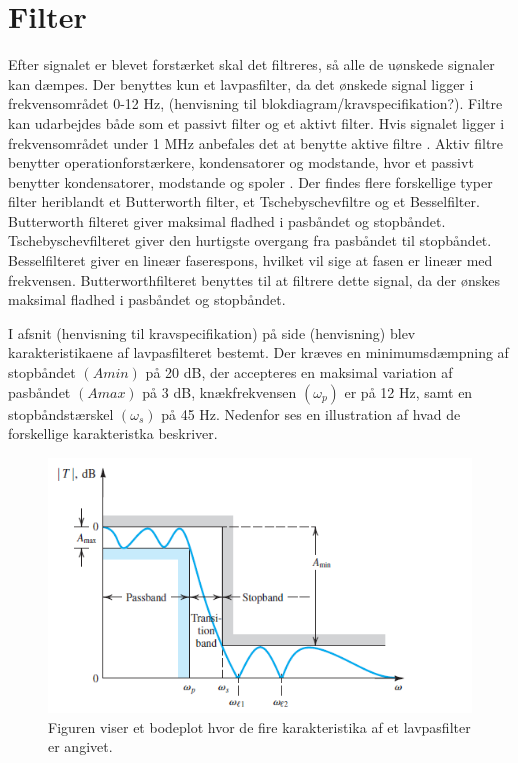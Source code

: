 \section{Filter}
Efter signalet er blevet forstærket skal det filtreres, så alle de uønskede signaler kan dæmpes. Der benyttes kun et lavpasfilter, da det ønskede signal ligger i frekvensområdet 0-12 Hz, (henvisning til blokdiagram/kravspecifikation?). Filtre kan udarbejdes både som et passivt filter og et aktivt filter. Hvis signalet ligger i frekvensområdet under 1 MHz anbefales det at benytte aktive filtre \cite{Op amps for everyone}. Aktiv filtre benytter operationforstærkere, kondensatorer og modstande, hvor et passivt benytter kondensatorer, modstande og spoler \cite{Op amps for everyone}. Der findes flere forskellige typer filter heriblandt et Butterworth filter, et Tschebyschevfiltre og et Besselfilter. Butterworth filteret giver maksimal fladhed i pasbåndet og stopbåndet. Tschebyschevfilteret giver den hurtigste overgang fra pasbåndet til stopbåndet. Besselfilteret giver en lineær faserespons, hvilket vil sige at fasen er lineær med frekvensen. \cite{Op amps for everyone} Butterworthfilteret benyttes til at filtrere dette signal, da der ønskes maksimal fladhed i pasbåndet og stopbåndet.

I afsnit (henvisning til kravspecifikation) på side (henvisning) blev karakteristikaene af lavpasfilteret bestemt. Der kræves en minimumsdæmpning af stopbåndet $(Amin)$ på 20 dB, der accepteres en maksimal variation af pasbåndet $(Amax)$ på 3 dB, knækfrekvensen $(\omega _p)$ er på 12 Hz, samt en stopbåndstærskel $( \omega _s)$ på 45 Hz. Nedenfor ses en illustration af hvad de forskellige karakteristka beskriver.

\begin{figure}[H]
\center
\includegraphics[scale=1]{figures/cProblemloesning/Lavpasfilter_generisk.PNG}
\caption{Figuren viser et bodeplot hvor de fire karakteristika af et lavpasfilter er angivet.}
\label{fig:lavpasfilter_generisk}
\end{figure} 

